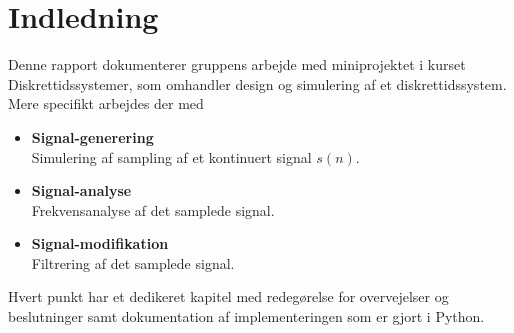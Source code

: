 \chapter{Indledning}
Denne rapport dokumenterer gruppens arbejde med miniprojektet i kurset Diskrettidssystemer, som omhandler design og simulering af et diskrettidssystem. Mere specifikt arbejdes der med
\begin{itemize}
\setlength\itemsep{0em}
\item \textbf{Signal-generering}\\
Simulering af sampling af et kontinuert signal $s(n)$.
\item \textbf{Signal-analyse}\\
Frekvensanalyse af det samplede signal.
\item \textbf{Signal-modifikation}\\
Filtrering af det samplede signal.
\end{itemize}
Hvert punkt har et dedikeret kapitel med redegørelse for overvejelser og beslutninger samt dokumentation af implementeringen som er gjort i Python.